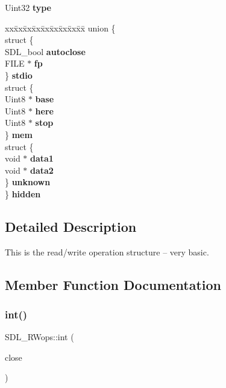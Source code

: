 \begin{DoxyCompactItemize}
\item 
\mbox{\label{struct_s_d_l___r_wops_a099017bfceaac24ced0e4d08a4e0a023}} 
Uint32 {\bfseries type}
\item 
\mbox{\label{struct_s_d_l___r_wops_a405b33699468d0da7376db88c68131c1}} 
\begin{tabbing}
xx\=xx\=xx\=xx\=xx\=xx\=xx\=xx\=xx\=\kill
union \{\\
\>struct \{\\
\>\>SDL\_bool {\bfseries autoclose}\\
\>\>FILE $\ast$ {\bfseries fp}\\
\>\} {\bfseries stdio}\\
\>struct \{\\
\>\>Uint8 $\ast$ {\bfseries base}\\
\>\>Uint8 $\ast$ {\bfseries here}\\
\>\>Uint8 $\ast$ {\bfseries stop}\\
\>\} {\bfseries mem}\\
\>struct \{\\
\>\>void $\ast$ {\bfseries data1}\\
\>\>void $\ast$ {\bfseries data2}\\
\>\} {\bfseries unknown}\\
\} {\bfseries hidden}\\

\end{tabbing}\end{DoxyCompactItemize}


\subsection{Detailed Description}
This is the read/write operation structure -- very basic. 

\subsection{Member Function Documentation}
\mbox{\label{struct_s_d_l___r_wops_ab303bcbb0f6742a141ba8b2998923f47}} 
\subsubsection{\texorpdfstring{int()}{int()}}
{\footnotesize\ttfamily S\+D\+L\+\_\+\+R\+Wops\+::int (\begin{DoxyParamCaption}\item[{S\+D\+L\+C\+A\+LL $\ast$}]{close }\end{DoxyParamCaption})}

